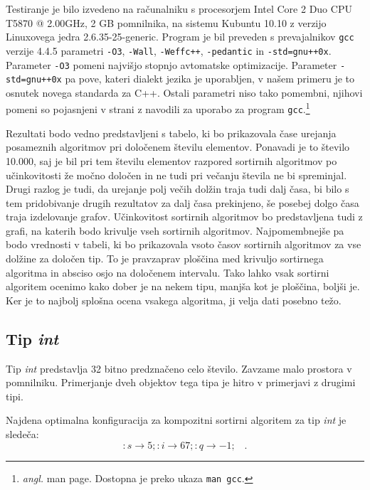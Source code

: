 \documentclass[a4paper,oneside,12pt]{article}
\newcommand{\lra}{\ensuremath{\longrightarrow}}
\newcommand{\edot}{\;\;\;.}
\begin{document}
Testiranje je bilo izvedeno na računalniku s procesorjem Intel\textregistered{} Core\texttrademark{}
2 Duo CPU T5870 @ 2.00GHz, 2 GB pomnilnika, na sistemu Kubuntu 10.10 z verzijo Linuxovega jedra 2.6.35-25-generic.
Program je bil preveden s prevajalnikov \texttt{gcc} verzije 4.4.5 parametri \texttt{-O3},
\texttt{-Wall}, \texttt{-Weffc++}, \texttt{-pedantic} in \texttt{-std=gnu++0x}.
Parameter \texttt{-O3} pomeni najvišjo stopnjo avtomatske optimizacije. Parameter \texttt{-std=gnu++0x} 
pa pove, kateri dialekt jezika je uporabljen, v našem primeru je to osnutek novega standarda za C++.
Ostali parametri niso tako pomembni, njihovi pomeni so pojasnjeni v strani z navodili za uporabo za program 
\texttt{gcc}.\footnote{\emph{angl.} man page. Dostopna je preko ukaza \texttt{man gcc}.}

Rezultati bodo vedno predstavljeni s tabelo, ki bo prikazovala čase urejanja
posameznih algoritmov pri določenem številu elementov. Ponavadi je to število
10.000, saj je bil pri tem številu elementov razpored sortirnih algoritmov po
učinkovitosti že močno določen in ne tudi pri večanju števila ne bi spreminjal.
Drugi razlog je tudi, da urejanje polj večih dolžin traja tudi dalj časa, bi
bilo s tem pridobivanje drugih rezultatov za dalj časa prekinjeno, še posebej
dolgo časa traja izdelovanje grafov.
Učinkovitost sortirnih algoritmov bo predstavljena tudi z 
grafi, na katerih bodo krivulje vseh sortirnih algoritmov. Najpomembnejše pa
bodo vrednosti v tabeli, ki bo prikazovala vsoto časov sortirnih algoritmov za
vse dolžine za določen tip. To je pravzaprav ploščina med krivuljo sortirnega
algoritma in absciso osjo na določenem intervalu. Tako lahko vsak sortirni
algoritem ocenimo kako dober je na nekem tipu, manjša kot je ploščina, boljši
je. Ker je to najbolj splošna ocena vsakega algoritma, ji velja dati posebno
težo.  
 
\subsection{Tip \emph{int}}
\label{chapter:rez:int}
Tip \emph{int} predstavlja 32 bitno predznačeno celo število. Zavzame malo prostora v 
pomnilniku. Primerjanje dveh objektov tega tipa je hitro v primerjavi z drugimi tipi.

Najdena optimalna konfiguracija za kompozitni sortirni algoritem za tip \emph{int} je sledeča:
\[ :s \lra 5;:i \lra 67;:q \lra -1; \edot \]
\end{document}
